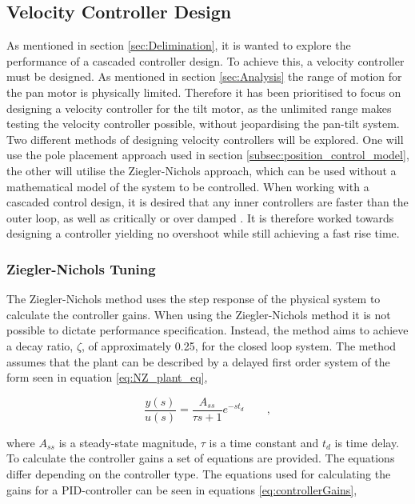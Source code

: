 \documentclass[../../main.tex]{subfiles}
\begin{document}
\subsection{Velocity Controller Design} \label{subsec:vel_controller_design}
As mentioned in section \ref{sec:Delimination}, it is wanted to explore the performance of a cascaded controller design. To achieve this, a velocity controller must be designed. As mentioned in section \ref{sec:Analysis} the range of motion for the pan motor is physically limited. Therefore it has been prioritised to focus on designing a velocity controller for the tilt motor, as the unlimited range makes testing the velocity controller possible, without jeopardising the pan-tilt system. Two different methods of designing velocity controllers will be explored. One will use the pole placement approach used in section \ref{subsec:position_control_model}, the other will utilise the Ziegler-Nichols approach, which can be used without a mathematical model of the system to be controlled.
When working with a cascaded control design, it is desired that any inner controllers are faster than the outer loop, as well as critically or over damped \cite{}. It is therefore worked towards designing a controller yielding no overshoot while still achieving a fast rise time.

\subsubsection*{Ziegler-Nichols Tuning}
The Ziegler-Nichols method uses the step response of the physical system to calculate the controller gains. When using the Ziegler-Nichols method it is not possible to dictate performance specification. Instead, the method aims to achieve a decay ratio, $\zeta$, of approximately 0.25, for the closed loop system. The method assumes that the plant can be described by a delayed first order system of the form seen in equation \ref{eq:NZ_plant_eq},

\begin{equation}
    \frac{y(s)}{u(s)} = \frac{A_{ss}}{\tau s + 1} e^{-s t_d} \qquad ,
    \label{eq:NZ_plant_eq}
\end{equation}

where $A_{ss}$ is a steady-state magnitude, $\tau$ is a time constant and $t_{d}$ is time delay. To calculate the controller gains a set of equations are provided. The equations differ depending on the controller type. The equations used for calculating the gains for a PID-controller can be seen in equations \ref{eq:controllerGains},
\end{document}
